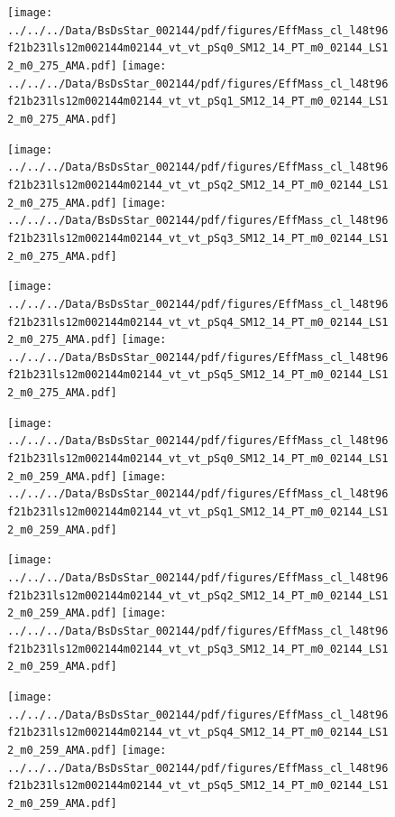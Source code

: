 \documentclass[a4paper,10pt]{article}
\begin{document}
\begin{figure}[p]
 \texttt{[image: ../../../Data/BsDsStar\_002144/pdf/figures/EffMass\_cl\_l48t96f21b231ls12m002144m02144\_vt\_vt\_pSq0\_SM12\_14\_PT\_m0\_02144\_LS12\_m0\_275\_AMA.pdf]} 
 \texttt{[image: ../../../Data/BsDsStar\_002144/pdf/figures/EffMass\_cl\_l48t96f21b231ls12m002144m02144\_vt\_vt\_pSq1\_SM12\_14\_PT\_m0\_02144\_LS12\_m0\_275\_AMA.pdf]} 
 \end{figure}
\begin{figure}[p]
 \texttt{[image: ../../../Data/BsDsStar\_002144/pdf/figures/EffMass\_cl\_l48t96f21b231ls12m002144m02144\_vt\_vt\_pSq2\_SM12\_14\_PT\_m0\_02144\_LS12\_m0\_275\_AMA.pdf]} 
 \texttt{[image: ../../../Data/BsDsStar\_002144/pdf/figures/EffMass\_cl\_l48t96f21b231ls12m002144m02144\_vt\_vt\_pSq3\_SM12\_14\_PT\_m0\_02144\_LS12\_m0\_275\_AMA.pdf]} 
 \end{figure}
\begin{figure}[p]
 \texttt{[image: ../../../Data/BsDsStar\_002144/pdf/figures/EffMass\_cl\_l48t96f21b231ls12m002144m02144\_vt\_vt\_pSq4\_SM12\_14\_PT\_m0\_02144\_LS12\_m0\_275\_AMA.pdf]} 
 \texttt{[image: ../../../Data/BsDsStar\_002144/pdf/figures/EffMass\_cl\_l48t96f21b231ls12m002144m02144\_vt\_vt\_pSq5\_SM12\_14\_PT\_m0\_02144\_LS12\_m0\_275\_AMA.pdf]} 
 \end{figure}
\clearpage
\begin{figure}[p]
 \texttt{[image: ../../../Data/BsDsStar\_002144/pdf/figures/EffMass\_cl\_l48t96f21b231ls12m002144m02144\_vt\_vt\_pSq0\_SM12\_14\_PT\_m0\_02144\_LS12\_m0\_259\_AMA.pdf]} 
 \texttt{[image: ../../../Data/BsDsStar\_002144/pdf/figures/EffMass\_cl\_l48t96f21b231ls12m002144m02144\_vt\_vt\_pSq1\_SM12\_14\_PT\_m0\_02144\_LS12\_m0\_259\_AMA.pdf]} 
 \end{figure}
\begin{figure}[p]
 \texttt{[image: ../../../Data/BsDsStar\_002144/pdf/figures/EffMass\_cl\_l48t96f21b231ls12m002144m02144\_vt\_vt\_pSq2\_SM12\_14\_PT\_m0\_02144\_LS12\_m0\_259\_AMA.pdf]} 
 \texttt{[image: ../../../Data/BsDsStar\_002144/pdf/figures/EffMass\_cl\_l48t96f21b231ls12m002144m02144\_vt\_vt\_pSq3\_SM12\_14\_PT\_m0\_02144\_LS12\_m0\_259\_AMA.pdf]} 
 \end{figure}
\begin{figure}[p]
 \texttt{[image: ../../../Data/BsDsStar\_002144/pdf/figures/EffMass\_cl\_l48t96f21b231ls12m002144m02144\_vt\_vt\_pSq4\_SM12\_14\_PT\_m0\_02144\_LS12\_m0\_259\_AMA.pdf]} 
 \texttt{[image: ../../../Data/BsDsStar\_002144/pdf/figures/EffMass\_cl\_l48t96f21b231ls12m002144m02144\_vt\_vt\_pSq5\_SM12\_14\_PT\_m0\_02144\_LS12\_m0\_259\_AMA.pdf]} 
 \end{figure}
\clearpage
\clearpage
\end{document}
